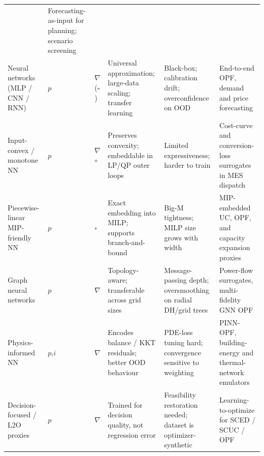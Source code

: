 \begin{table}[!t]
\begin{tabularx}{\textwidth}{@{}L{0.16\textwidth} C{0.05\textwidth} C{0.08\textwidth} L{0.21\textwidth} L{0.20\textwidth} L{0.22\textwidth}@{}}
      & Forecasting-as-input for planning; scenario screening
        \cite{Eseye201991463,Faraji2020157284,Hanifi2024,Madhukumar20228891} \\
    Neural networks (MLP / CNN / RNN)
      & $p$ & $\nabla$ ($\square$)
      & Universal approximation; large-data scaling; transfer learning
      & Black-box; calibration drift; overconfidence on OOD
      & End-to-end OPF, demand and price forecasting
        \cite{Chen20244723,Chen2022,Wu2022231,Xu20223066,Guo20222057,Li202359995} \\
    Input-convex / monotone NN
      & $p$ & $\nabla$ $\circ$
      & Preserves convexity; embeddable in LP/QP outer loops
      & Limited expressiveness; harder to train
      & Cost-curve and conversion-loss surrogates in MES dispatch
        \cite{Liu20242534,Wu2024391,Pang2023,Lin2023} \\
    Piecewise-linear MIP-friendly NN
      & $p$ & $\square$
      & Exact embedding into MILP; supports branch-and-bound
      & Big-M tightness; MILP size grows with width
      & MIP-embedded UC, OPF, and capacity expansion proxies
        \cite{Wu2022231,Liu20223726,Liang20246508,Pang2023} \\
    Graph neural networks
      & $p$    & $\nabla$
      & Topology-aware; transferable across grid sizes
      & Message-passing depth; oversmoothing on radial DH/grid trees
      & Power-flow surrogates, multi-fidelity GNN OPF
        \cite{Park2019,Su2022315,Khayambashi202453,Taghizadeh2024} \\
    Physics-informed NN
      & $p$,$i$ & $\nabla$
      & Encodes balance / KKT residuals; better OOD behaviour
      & PDE-loss tuning hard; convergence sensitive to weighting
      & PINN-OPF, building-energy and thermal-network emulators
        \cite{Park2019,Petrova2025,Du2025,Chaudhry2024} \\
    Decision-focused / L2O proxies
      & $p$ & $\nabla$
      & Trained for decision quality, not regression error
      & Feasibility restoration needed; dataset is optimizer-synthetic
      & Learning-to-optimize for SCED / SCUC / OPF
        \cite{Wu2022231,Chen20244723,Chen2022,Liu20223726,Wu2024391,Liang20246508} \\
    \bottomrule
  \end{tabularx}
\end{table}
